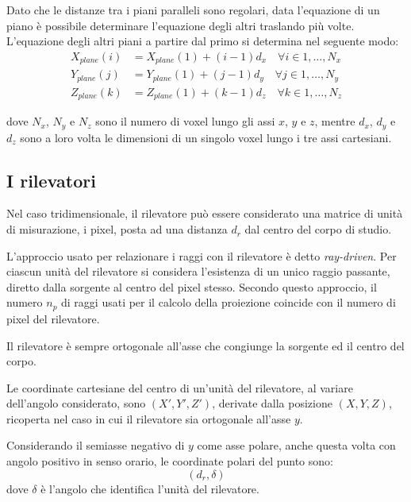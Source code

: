 \documentclass[12pt,a4paper]{report}
\begin{document}
Dato che le distanze tra i piani paralleli sono regolari, data l'equazione di un piano è possibile determinare l'equazione degli
altri traslando più volte.
L'equazione degli altri piani a partire dal primo si determina nel seguente modo:
\begin{align*}
  X_{plane}(i) &= X_{plane}(1) + (i - 1) d_x \quad \forall i \in 1, \dots, N_x \\
  Y_{plane}(j) &= Y_{plane}(1) + (j - 1) d_y \quad \forall j \in 1, \dots, N_y \\
  Z_{plane}(k) &= Z_{plane}(1) + (k - 1) d_z \quad \forall k \in 1, \dots, N_z
\end{align*}

dove \(N_x\), \(N_y\) e \(N_z\) sono il numero di voxel lungo gli assi \(x\), \(y\) e \(z\), mentre \(d_x\), \(d_y\) e \(d_z\)
sono a loro volta le dimensioni di un singolo voxel lungo i tre assi cartesiani.

\subsection{I rilevatori}

Nel caso tridimensionale, il rilevatore può essere considerato una matrice di unità di misurazione, i pixel, posta ad una distanza
\(d_r\) dal centro del corpo di studio.

L'approccio usato per relazionare i raggi con il rilevatore è detto \textit{ray-driven}.
Per ciascun unità del rilevatore si considera l'esistenza di un unico raggio passante, diretto dalla sorgente al centro del
pixel stesso.
Secondo questo approccio, il numero \(n_p\) di raggi usati per il calcolo della proiezione coincide con il numero di pixel del
rilevatore.

Il rilevatore è sempre ortogonale all'asse che congiunge la sorgente ed il centro del corpo.

Le coordinate cartesiane del centro di un'unità del rilevatore, al variare dell'angolo considerato, sono \((X', Y', Z')\),
derivate dalla posizione \((X, Y, Z)\), ricoperta nel caso in cui il rilevatore sia ortogonale all'asse \(y\).

Considerando il semiasse negativo di \(y\) come asse polare, anche questa volta con angolo positivo in senso orario, le
coordinate polari del punto sono:
\begin{equation*} %
  (d_r, \delta)
\end{equation*}
dove \(\delta\) è l'angolo che identifica l'unità del rilevatore.
\end{document}
